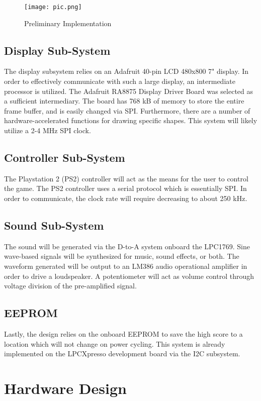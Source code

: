 \documentclass[a4paper, 12pt]{article}
\begin{document}
\begin{figure}[h!]
  \centering
  \texttt{[image: pic.png]}
  \caption{Preliminary Implementation}
  \label{fig:pic}
\end{figure}

\subsection*{Display Sub-System}
The display subsystem relies on an Adafruit 40-pin LCD 480x800 7" display. In order to effectively communicate with such a large display, an intermediate processor is utilized. The Adafruit RA8875 Display Driver Board was selected as a sufficient intermediary. The board has 768 kB of memory to store the entire frame buffer, and is easily changed via SPI. Furthermore, there are a number of hardware-accelerated functions for drawing specific shapes. This system will likely utilize a 2-4 MHz SPI clock. 

\subsection*{Controller Sub-System}
The Playstation 2 (PS2) controller will act as the means for the user to control the game. The PS2 controller uses a serial protocol which is essentially SPI. In order to communicate, the clock rate will require decreasing to about 250 kHz. 

\subsection*{Sound Sub-System}
The sound will be generated via the D-to-A system onboard the LPC1769. Sine wave-based signals will be synthesized for music, sound effects, or both. The waveform generated will be output to an LM386 audio operational amplifier in order to drive a loudspeaker. A potentiometer will act as volume control through voltage division of the pre-amplified signal. 

\subsection*{EEPROM}
Lastly, the design relies on the onboard EEPROM to save the high score to a location which will not change on power cycling. This system is already implemented on the LPCXpresso development board via the I2C subsystem.  

\section*{Hardware Design}
\end{document}
